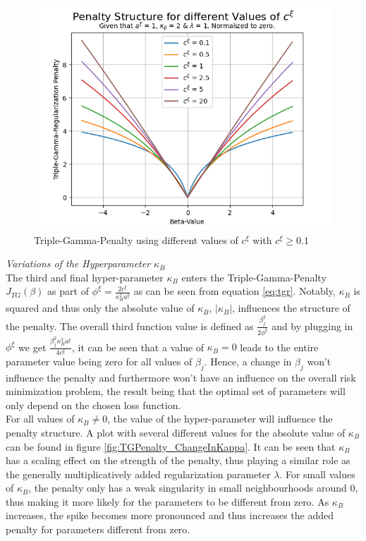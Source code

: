 \documentclass[12pt,a4paper]{article}
\begin{document}
\begin{figure}[!h]
\centering
\includegraphics[scale=0.75]{../02_simulation/021_simulation_figures/TGPenalty_ChangeInC_Part1.png}
\caption{Triple-Gamma-Penalty using different values of $c^\xi$ with $c^\xi \geq 0.1$}
\label{fig:ChangeInC_LargeValues}
\end{figure}

\textit{Variations of the Hyperparameter $\kappa_B$}\\

The third and final hyper-parameter $\kappa_B$ enters the Triple-Gamma-Penalty $J_{TG}(\beta)$ as part of $\phi^\xi = \frac{2c^\xi}{\kappa_B^2 a^\xi}$ as can be seen from equation \ref{eq:tgr}. Notably, $\kappa_B$ is squared and thus only the absolute value of $\kappa_B$, $|\kappa_B|$, influences the structure of the penalty. The overall third function value is defined as $\frac{\beta_j^2}{2\phi^\xi}$ and by plugging in $\phi^\xi$ we get $\frac{\beta_j^2\kappa_ B^2a^\xi}{4c^\xi}$, it can be seen that a value of $\kappa_B = 0$ leads to the entire parameter value being zero for all values of $\beta_j$. Hence, a change in $\beta_j$ won't influence the penalty and furthermore won't have an influence on the overall risk minimization problem, the result being that the optimal set of parameters will only depend on the chosen loss function.\\

For all values of $\kappa_B \neq 0$, the value of the hyper-parameter will influence the penalty structure. A plot with several different values for the absolute value of $\kappa_B$ can be found in figure \ref{fig:TGPenalty_ChangeInKappa}. It can be seen that $\kappa_B$ has a scaling effect on the strength of the penalty, thus playing a similar role as the generally multiplicatively added regularization parameter $\lambda$. For small values of $\kappa_B$, the penalty only has a weak singularity in small neighbourhoods around $0$, thus making it more likely for the parameters to be different from zero. As $\kappa_B$ increases, the spike becomes more pronounced and thus increases the added penalty for parameters different from zero. \\
\end{document}
